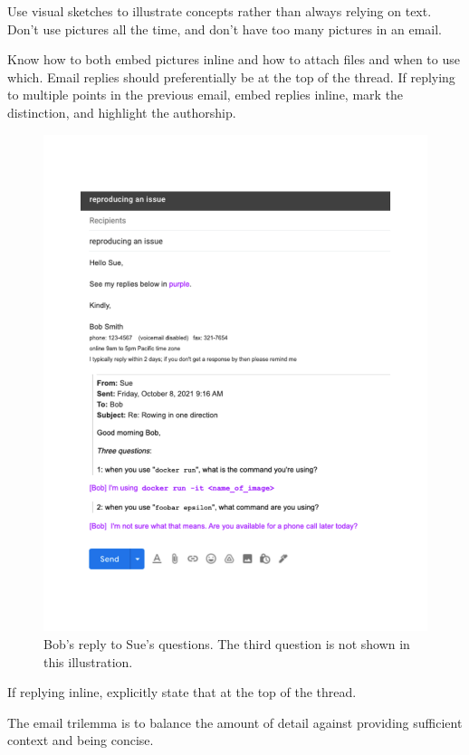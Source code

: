 Use visual sketches to illustrate concepts rather than always relying on text. Don't use pictures all the time, and don't have too many pictures in an email. 

Know how to both embed pictures inline and how to attach files and when to use which. 
Email replies should preferentially be at the top of the thread. 
If replying to multiple points in the previous email, embed replies inline, mark the distinction, and highlight the authorship. 

\begin{figure}
\includegraphics[width=1\textwidth]{images/email_reply.pdf}
\caption{Bob's reply to Sue's questions. The third question is not shown in this illustration.}
\label{fig:email_reply}
\end{figure}

If replying inline, explicitly state that at the top of the thread.

The email trilemma is to balance the amount of detail against providing sufficient context and being concise. 

